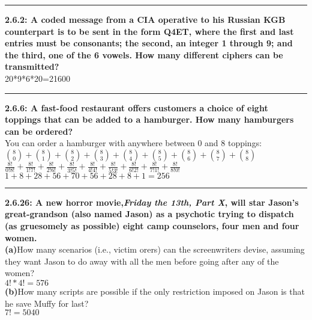 \documentclass[11pt]{article}
\newcommand\question[2]{\vspace{.25in}\hrule\textbf{#1: #2}}
\renewcommand\part[1]{\vspace{.10in}\textbf{(#1)}}
\begin{document}
\raggedright
\newcommand\NAME{Jonathan Lopez}  %
\newcommand\HWNUM{2}              %


\question{2.6.2} {A coded message from a CIA operative to his Russian KGB counterpart
is to be sent in the form Q4ET, where the first and last entries must be consonants;
the second, an integer 1 through 9; and the third, one of the 6 vowels. How many
different ciphers can be transmitted?}\\
20*9*6*20=21600

\question{2.6.6}{A fast-food restaurant offers customers a choice of eight
toppings that can be added to a hamburger. How many hamburgers can be ordered?}\\
You can order a hamburger with anywhere between 0 and 8 toppings:
$
\binom{8}{0}+
\binom{8}{1}+
\binom{8}{2}+
\binom{8}{3}+
\binom{8}{4}+
\binom{8}{5}+
\binom{8}{6}+
\binom{8}{7}+
\binom{8}{8}
$ \\
$
\frac{8!}{0!8!} + 
\frac{8!}{1!7!} + 
\frac{8!}{2!6!} + 
\frac{8!}{3!5!} + 
\frac{8!}{4!4!} + 
\frac{8!}{5!3!} + 
\frac{8!}{6!2!} + 
\frac{8!}{7!1!} + 
\frac{8!}{8!0!}
$
\\
$ 
1 + 8 + 28 + 56 + 70 + 56 + 28 + 8 + 1 = 256
$ 
\\

\question{2.6.26}{A new horror movie,\emph{Friday the 13th, Part X}, will star
    Jason's great-grandson (also named Jason) as a psychotic trying to dispatch
(as gruesomely as possible) eight camp counselors, four men and four women.}
\\ \part{a}{How many scenarios (i.e., victim orers) can the screenwriters devise,
assuming they want Jason to do away with all the men before going after any of the
women?} \\
$4!*4!=576$
\\ \part{b}{How many scripts are possible if the only restriction imposed on Jason
is that he save Muffy for last?} \\
$7!=5040$
\end{document}
